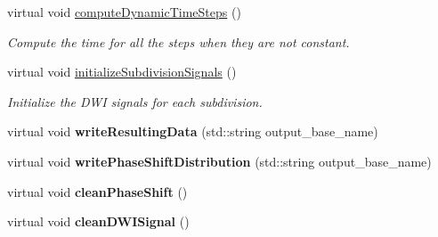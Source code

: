 \begin{DoxyCompactItemize}
\mbox{\label{class_simulable_sequence_a3c5285531564cdb204894e6c6fc9204e}} 
virtual void \hyperlink{class_simulable_sequence_a3c5285531564cdb204894e6c6fc9204e}{compute\+Dynamic\+Time\+Steps} ()
\begin{DoxyCompactList}\small\item\em Compute the time for all the steps when they are not constant. \end{DoxyCompactList}\item 
\mbox{\label{class_simulable_sequence_aa2434c3b2ef59d1cd8b822b8e3a2920c}} 
virtual void \hyperlink{class_simulable_sequence_aa2434c3b2ef59d1cd8b822b8e3a2920c}{initialize\+Subdivision\+Signals} ()
\begin{DoxyCompactList}\small\item\em Initialize the D\+WI signals for each subdivision. \end{DoxyCompactList}\item 
\mbox{\label{class_simulable_sequence_a372f6d9f448c537afde10e30b68428aa}} 
virtual void {\bfseries write\+Resulting\+Data} (std\+::string output\+\_\+base\+\_\+name)
\item 
\mbox{\label{class_simulable_sequence_aa6c72a9d84fda0fe15551f84a28d427d}} 
virtual void {\bfseries write\+Phase\+Shift\+Distribution} (std\+::string output\+\_\+base\+\_\+name)
\item 
\mbox{\label{class_simulable_sequence_a49a95a0735a939b65495be51ce0fb1be}} 
virtual void {\bfseries clean\+Phase\+Shift} ()
\item 
\mbox{\label{class_simulable_sequence_af8396d72ccbb4ad1e8a403e554b8e8e1}} 
virtual void {\bfseries clean\+D\+W\+I\+Signal} ()
\end{DoxyCompactItemize}
